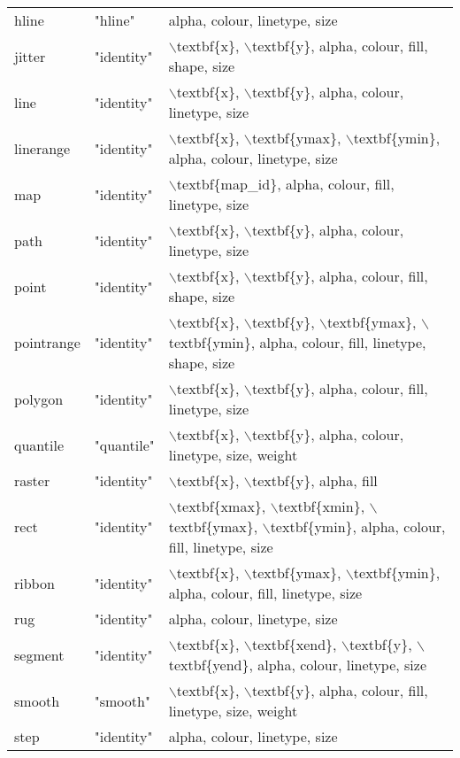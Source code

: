 \begin{table}[ht]
\begin{tabular}{lll}
  hline & "hline" & alpha, colour, linetype, size \\ 
  jitter & "identity" & $\backslash$textbf\{x\}, $\backslash$textbf\{y\}, alpha, colour, fill, shape, size \\ 
  line & "identity" & $\backslash$textbf\{x\}, $\backslash$textbf\{y\}, alpha, colour, linetype, size \\ 
  linerange & "identity" & $\backslash$textbf\{x\}, $\backslash$textbf\{ymax\}, $\backslash$textbf\{ymin\}, alpha, colour, linetype, size \\ 
  map & "identity" & $\backslash$textbf\{map\_id\}, alpha, colour, fill, linetype, size \\ 
  path & "identity" & $\backslash$textbf\{x\}, $\backslash$textbf\{y\}, alpha, colour, linetype, size \\ 
  point & "identity" & $\backslash$textbf\{x\}, $\backslash$textbf\{y\}, alpha, colour, fill, shape, size \\ 
  pointrange & "identity" & $\backslash$textbf\{x\}, $\backslash$textbf\{y\}, $\backslash$textbf\{ymax\}, $\backslash$textbf\{ymin\}, alpha, colour, fill, linetype, shape, size \\ 
  polygon & "identity" & $\backslash$textbf\{x\}, $\backslash$textbf\{y\}, alpha, colour, fill, linetype, size \\ 
  quantile & "quantile" & $\backslash$textbf\{x\}, $\backslash$textbf\{y\}, alpha, colour, linetype, size, weight \\ 
  raster & "identity" & $\backslash$textbf\{x\}, $\backslash$textbf\{y\}, alpha, fill \\ 
  rect & "identity" & $\backslash$textbf\{xmax\}, $\backslash$textbf\{xmin\}, $\backslash$textbf\{ymax\}, $\backslash$textbf\{ymin\}, alpha, colour, fill, linetype, size \\ 
  ribbon & "identity" & $\backslash$textbf\{x\}, $\backslash$textbf\{ymax\}, $\backslash$textbf\{ymin\}, alpha, colour, fill, linetype, size \\ 
  rug & "identity" & alpha, colour, linetype, size \\ 
  segment & "identity" & $\backslash$textbf\{x\}, $\backslash$textbf\{xend\}, $\backslash$textbf\{y\}, $\backslash$textbf\{yend\}, alpha, colour, linetype, size \\ 
  smooth & "smooth" & $\backslash$textbf\{x\}, $\backslash$textbf\{y\}, alpha, colour, fill, linetype, size, weight \\ 
  step & "identity" & alpha, colour, linetype, size \\ 

\end{tabular}
\end{table}
